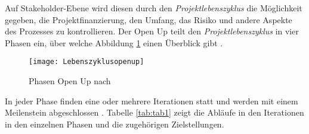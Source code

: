 Auf Stakeholder-Ebene wird diesen durch den \textit{Projektlebenszyklus} die Möglichkeit gegeben, die Projektfinanzierung, den Umfang, das Risiko und andere Aspekte des Prozesses zu kontrollieren.
Der Open Up teilt den \textit{Projektlebenszyklus} in vier Phasen ein, über welche Abbildung \ref{fig:Phasen} einen Überblick gibt \cite{eclipseopenup}.

\begin{figure}[htp]
\begin{center}
  \texttt{[image: Lebenszyklusopenup]} %
  \caption{Phasen Open Up nach \cite{eclipseopenup}}
  \label{fig:Phasen}
\end{center}
\end{figure}


In jeder Phase finden eine oder mehrere Iterationen statt und werden mit einem Meilenstein abgeschlossen \cite{Basem2010}. Tabelle \ref{tab:tab1} zeigt die Abläufe in den Iterationen in den einzelnen Phasen und die zugehörigen Zielstellungen.

